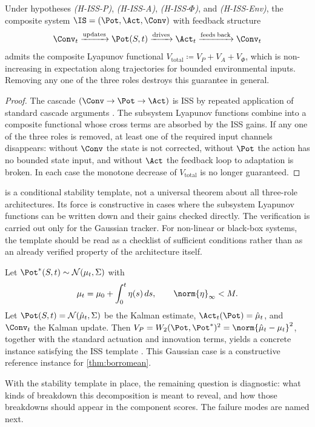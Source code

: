 \begin{theorem}\label{thm:borromean}
Under hypotheses \emph{(H-ISS-P)}, \emph{(H-ISS-A)}, \emph{(H-ISS-$\Phi$)},
and \emph{(H-ISS-Env)}, the composite system $\IS = (\Pot,\Act,\Conv)$ with
feedback structure
\[
  \Conv_t \xrightarrow{\mathrm{updates}} \Pot(S,t)
  \xrightarrow{\mathrm{drives}} \Act_t
  \xrightarrow{\mathrm{feeds\;back}} \Conv_t
\]
admits the composite Lyapunov functional
$V_{\mathrm{total}} \coloneqq V_P + V_A + V_\Phi$, which is non-increasing in
expectation along trajectories for bounded environmental inputs. Removing any
one of the three roles destroys this guarantee in general.
\end{theorem}

\begin{proof}
The cascade $(\Conv \to \Pot \to \Act)$ is ISS by repeated application of
standard cascade arguments \citep{sontag1989,sontag1995,dashkovskiy2010}. The
subsystem Lyapunov functions combine into a composite functional whose cross
terms are absorbed by the ISS gains. If any one of the three roles is removed,
at least one of the required input channels disappears: without $\Conv$ the
state is not corrected, without $\Pot$ the action has no bounded state input,
and without $\Act$ the feedback loop to adaptation is broken. In each case the
monotone decrease of $V_{\mathrm{total}}$ is no longer guaranteed.
\end{proof}

\begin{remark}\label{rem:stability_scope}
 is a conditional stability template, not a universal
theorem about all three-role architectures. Its force is constructive in cases
where the subsystem Lyapunov functions can be written down and their gains
checked directly. The verification is carried out only for the Gaussian
tracker. For non-linear or black-box systems, the template should be read as a
checklist of sufficient conditions rather than as an already verified property
of the architecture itself.
\end{remark}

\begin{example}\label{ex:concrete}
Let $\Pot^*(S,t)\sim\mathcal{N}(\mu_t,\Sigma)$ with
\[
  \mu_t = \mu_0 + \int_0^t \eta(s)\,ds,
  \qquad \norm{\eta}_\infty < M.
\]
Let $\Pot(S,t)=\mathcal{N}(\hat\mu_t,\Sigma)$ be the Kalman estimate,
$\Act_t(\Pot)=\hat\mu_t$, and $\Conv_t$ the Kalman update. Then
$V_P = W_2(\Pot,\Pot^*)^2 = \norm{\hat\mu_t-\mu_t}^2$, together with the
standard actuation and innovation terms, yields a concrete instance satisfying
the ISS template \citep{Jazwinski1970}. This Gaussian case is a constructive
reference instance for \cref{thm:borromean}.
\end{example}

With the stability template in place, the remaining question is diagnostic: what
kinds of breakdown this decomposition is meant to reveal, and how those
breakdowns should appear in the component scores. The failure modes are named
next.
